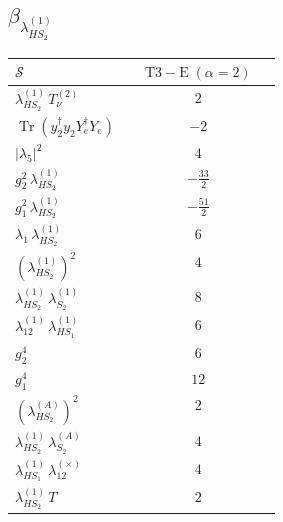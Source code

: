\documentclass[9pt]{article}
\begin{document}
\subsection*{$ \beta_{\lambda_{HS_2}^{(1)}} $}
\begin{longtable}{@{}p{0.31\linewidth}c@{}}
\toprule
$\mathcal{S}$ & $ \mathrm{T3-E}\;(\alpha=2) $ \\
\midrule
$ \lambda_{HS_2}^{(1)}\,T_{\nu}^{(2)} $ & $ 2 $ \\
$ \operatorname{Tr}(y_2^\dagger y_2Y_e^\dagger Y_e) $ & $ -2 $ \\
$ |\lambda_5|^2 $ & $ 4 $ \\
$ g_2^2\,\lambda_{HS_2}^{(1)} $ & $ - \frac{33}{2} $ \\
$ g_1^2\,\lambda_{HS_2}^{(1)} $ & $ - \frac{51}{2} $ \\
$ \lambda_1\,\lambda_{HS_2}^{(1)} $ & $ 6 $ \\
$ \left(\lambda_{HS_2}^{(1)}\right)^2 $ & $ 4 $ \\
$ \lambda_{HS_2}^{(1)}\,\lambda_{S_2}^{(1)} $ & $ 8 $ \\
$ \lambda_{12}^{(1)}\,\lambda_{HS_1}^{(1)} $ & $ 6 $ \\
$ g_2^4 $ & $ 6 $ \\
$ g_1^4 $ & $ 12 $ \\
$ \left(\lambda_{HS_2}^{(A)}\right)^2 $ & $ 2 $ \\
$ \lambda_{HS_2}^{(1)}\,\lambda_{S_2}^{(A)} $ & $ 4 $ \\
$ \lambda_{HS_1}^{(1)}\,\lambda_{12}^{(\times)} $ & $ 4 $ \\
$ \lambda_{HS_2}^{(1)}\,T $ & $ 2 $ \\
\bottomrule
\end{longtable}
\end{document}
